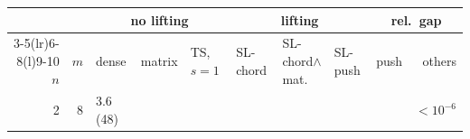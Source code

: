 \begin{tabular}{@{}rr llllll rr@{}}
\toprule
 & & \multicolumn{3}{c}{no lifting} & \multicolumn{3}{c}{lifting} & \multicolumn{2}{c}{rel.\ gap}\\
\cmidrule(lr){3-5}\cmidrule(lr){6-8}\cmidrule(l){9-10}
$n$ & $m$ & dense & matrix & TS, $s=1$ & SL-chord & SL-chord$\wedge$mat. & SL-push & push & others\\
\midrule
2 & 8 & 3.6 (48) &  &  &  &  &  &  & $<\!10^{-6}$ \\
\bottomrule
\end{tabular}
